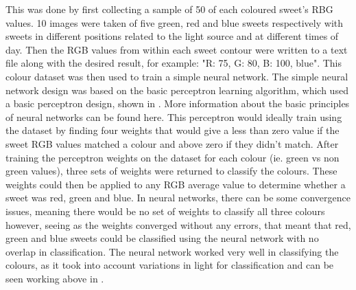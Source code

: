 This was done by first collecting a sample of 50 of each coloured sweet's RBG values. 10 images were taken of five green, red and blue sweets respectively with sweets in different positions related to the light source and at different times of day. Then the RGB values from within each sweet contour were written to a text file along with the desired result, for example: "R: 75, G: 80, B: 100, blue". This colour dataset was then used to train a simple neural network. The simple neural network design was based on the basic perceptron learning algorithm, which used a basic perceptron design, shown in \textbf{}. More information about the basic principles of neural networks can be found here\cite{neuralnetworks}. This perceptron would ideally train using the dataset by finding four weights that would give a less than zero value if the sweet RGB values matched a colour and above zero if they didn't match. After training the perceptron weights on the dataset for each colour (ie. green vs non green values), three sets of weights were returned to classify the colours. 
These weights could then be applied to any RGB average value to determine whether a sweet was red, green and blue. In neural networks, there can be some convergence issues, meaning there would be no set of weights to classify all three colours however, seeing as the weights converged without any errors, that meant that red, green and blue sweets could be classified using the neural network with no overlap in classification. The neural network worked very well in classifying the colours, as it took into account variations in light for classification and can be seen working above in \textbf{}.

